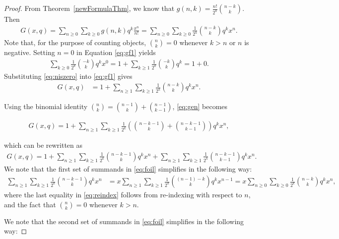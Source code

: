 \documentclass[11pt,reqno]{amsart}
\theoremstyle{definition}
\theoremstyle{notation}
\theoremstyle{openproblem}
\begin{document}
\begin{proof}
    From Theorem~\ref{newFormulaThm}, we know that $g(n,k)= \frac{n!}{2^k}\binom{n-k}{k}$. Then
    \begin{align}\label{eq:gf1}
        G(x,q) = \sum_{n\geq 0} \sum_{k\geq 0} g(n,k)q^k\frac{x^n}{n!} =  \sum_{n\geq 0} \sum_{k\geq 0} \frac{1}{2^k}\binom{n-k}{k}q^kx^n.
    \end{align}
    Note that, for the purpose of counting objects, $\binom{n}{k}=0$ whenever $k>n$ or $n$ is negative. Setting $n=0$ in Equation \eqref{eq:gf1} yields
    \begin{align} \label{eq:niszero}
         \sum_{k\geq 0} \frac{1}{2^k}\binom{-k}{k}q^kx^0= 1+ \sum_{k\geq 1} \frac{1}{2^k}\binom{-k}{k}q^k = 1 + 0.
    \end{align}
Substituting \eqref{eq:niszero} into \eqref{eq:gf1} gives
\begin{align}\label{eq:gen}
   G(x,q) &=  1+\sum_{n\geq 1} \sum_{k\geq 1} \frac{1}{2^k}\binom{n-k}{k}q^kx^n.
    \end{align}

Using the binomial identity $\binom{n}{k}=\binom{n-1}{k}+\binom{n-1}{k-1}$, \eqref{eq:gen} becomes

\begin{align}\label{eq:binomId}
        G(x,q) =  1+\sum_{n\geq 1} \sum_{k\geq 1} \frac{1}{2^k}\left ( \binom{n-k -1}{k} + \binom{n-k-1}{k-1}\right )q^kx^n,
    \end{align}
    
    
    which can be rewritten as
    \begin{align}\label{eq:foil}
            G(x,q) =  1+\sum_{n\geq 1} \sum_{k\geq 1} \frac{1}{2^k} \binom{n-k -1}{k}q^kx^n + \sum_{n\geq 1} \sum_{k\geq 1} \frac{1}{2^k} \binom{n-k-1}{k-1} q^kx^n.
    \end{align}
    We note that the first set of summands in \eqref{eq:foil} simplifies in the following way:
    \begin{align} \label{eq:reindex}
    \sum_{n\geq 1} \sum_{k\geq 1} \frac{1}{2^k} \binom{n-k -1}{k}q^kx^n &= x\sum_{n\geq 1} \sum_{k\geq 1} \frac{1}{2^k} \binom{(n-1) -k}{k}q^kx^{n-1}
    = x\sum_{n\geq 0} \sum_{k\geq 0} \frac{1}{2^k} \binom{n -k}{k}q^kx^{n},
    \end{align}
    where the last equality in \eqref{eq:reindex} follows from re-indexing with respect to $n$, and the fact that $\binom{n}{k}=0$ whenever $k>n$.

We note that the second set of summands in \eqref{eq:foil} simplifies in the following way:


\end{proof}
\end{document}
